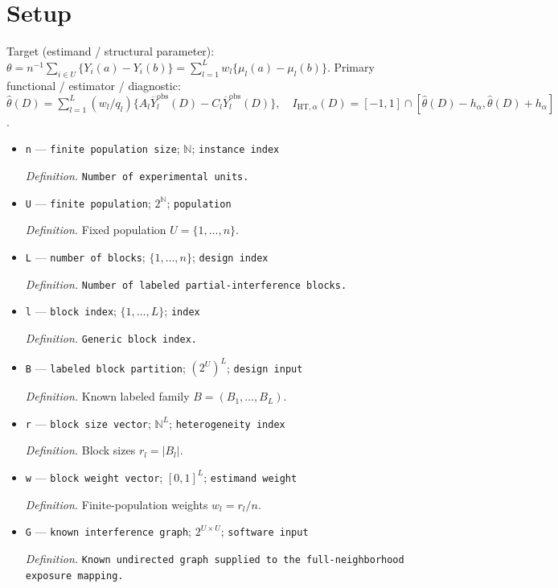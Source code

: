 \documentclass{article}
\begin{document}
\section{Setup}

Target (estimand / structural parameter): \(\theta=n^{-1}\sum_{i\in U}\{Y_i(a)-Y_i(b)\}=\sum_{l=1}^Lw_l\{\mu_l(a)-\mu_l(b)\}\).
Primary functional / estimator / diagnostic: \(\widehat\theta(D)=\sum_{l=1}^L(w_l/q_l)\{A_l\overline Y_l^{\mathrm{obs}}(D)-C_l\overline Y_l^{\mathrm{obs}}(D)\},\quad I_{\mathrm{HT},\alpha}(D)=[-1,1]\cap[\widehat\theta(D)-h_\alpha,\widehat\theta(D)+h_\alpha]\).
\begin{itemize}
  \item \texttt{n} --- \texttt{finite population size}; \(\mathbb N\); \texttt{instance index}
  \par\smallskip\noindent\emph{Definition.} \texttt{Number of experimental units.}
  \item \texttt{U} --- \texttt{finite population}; \(2^{\mathbb N}\); \texttt{population}
  \par\smallskip\noindent\emph{Definition.} Fixed population \(U=\{1,\ldots,n\}\).
  \item \texttt{L} --- \texttt{number of blocks}; \(\{1,\ldots,n\}\); \texttt{design index}
  \par\smallskip\noindent\emph{Definition.} \texttt{Number of labeled partial-\allowbreak{}interference blocks.}
  \item \texttt{l} --- \texttt{block index}; \(\{1,\ldots,L\}\); \texttt{index}
  \par\smallskip\noindent\emph{Definition.} \texttt{Generic block index.}
  \item \texttt{B} --- \texttt{labeled block partition}; \((2^U)^L\); \texttt{design input}
  \par\smallskip\noindent\emph{Definition.} Known labeled family \(B=(B_1,\ldots,B_L)\).
  \item \texttt{r} --- \texttt{block size vector}; \(\mathbb N^L\); \texttt{heterogeneity index}
  \par\smallskip\noindent\emph{Definition.} Block sizes \(r_l=|B_l|\).
  \item \texttt{w} --- \texttt{block weight vector}; \([0,1]^L\); \texttt{estimand weight}
  \par\smallskip\noindent\emph{Definition.} Finite-population weights \(w_l=r_l/n\).
  \item \texttt{G} --- \texttt{known interference graph}; \(2^{U\times U}\); \texttt{software input}
  \par\smallskip\noindent\emph{Definition.} \texttt{Known undirected graph supplied to the full-\allowbreak{}neighborhood exposure mapping.}

\end{itemize}
\end{document}
